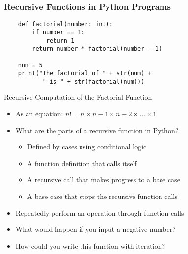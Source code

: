 \documentclass[14pt,aspectratio=169]{beamer}
\begin{document}
%
\begin{frame}[fragile]
  \frametitle{Recursive Functions in Python Programs}
  \hspace*{-.8in}
  \begin{minipage}{6in}
    \begin{verbatim}
    def factorial(number: int):
        if number == 1:
            return 1
        return number * factorial(number - 1)

    num = 5
    print("The factorial of " + str(num) +
           " is " + str(factorial(num)))
    \end{verbatim}
  \end{minipage}
  \vspace*{.05in}
\end{frame}

%
\begin{frame}{Recursive Computation of the Factorial Function}
  \begin{itemize}
    \item As an equation: $n! = n \times n-1 \times n-2 \times \ldots \times 1$
      \vspace*{-.15in}
    \item What are the parts of a recursive function in Python?
      \begin{itemize}
        \item Defined by cases using conditional logic
        \item A function definition that calls itself
        \item A recursive call that makes progress to a base case
        \item A base case that stops the recursive function calls
      \end{itemize}
      \vspace*{-.2in}
    \item Repeatedly perform an operation through function calls
      \vspace*{-.2in}
    \item What would happen if you input a negative number?
      \vspace*{-.2in}
    \item How could you write this function with iteration?
  \end{itemize}
\end{frame}
\end{document}
